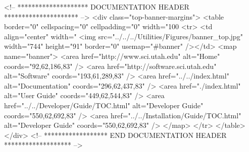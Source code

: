 \documentclass[11pt]{article}
\begin{document}


\begin{rawhtml}
<!-- ******************** DOCUMENTATION HEADER ********************* -->
<div class="top-banner-margins">
<table border="0" cellspacing="0" cellpadding="0" width="100%
<tr>
<td align="center" width="%
<img src="../../../Utilities/Figures/banner_top.jpg" width="744" height="91" border="0" usemap="#banner" /></td>
<map name="banner">
<area href="http://www.sci.utah.edu" alt="Home" coords="92,62,186,83" />
<area href="http://software.sci.utah.edu" alt="Software" coords="193,61,289,83" />
<area href="../../index.html" alt="Documentation" coords="296,62,437,83" />
<area href="./index.html" alt="User Guide" coords="449,62,544,83" />
<area href="../../Developer/Guide/TOC.html" alt="Developer Guide" coords="550,62,692,83" />
<area href="../../Installation/Guide/TOC.html" alt="Developer Guide" coords="550,62,692,83" />
</map>
</tr>
</table>
</div>
<!-- ****************** END DOCUMENTATION HEADER ******************* -->
\end{rawhtml}


\newpage
\tableofcontents
\newpage



\newpage




%

%

\newpage
%
\newpage
%

\newpage


\newpage
\printindex
\end{document}
